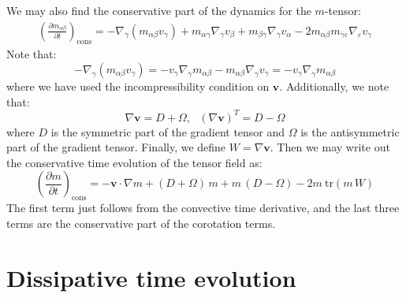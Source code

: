 \documentclass[reqno]{article}
\begin{document}
  We may also find the conservative part of the dynamics for the $m$-tensor:
  \begin{equation}
    \begin{split}
      \left( \frac{\partial m_{\alpha \beta}}{\partial t} \right)_\text{cons}
      =
      - \nabla_\gamma \left( m_{\alpha \beta} v_\gamma \right)
      + m_{\alpha \gamma} \nabla_\gamma v_\beta
      + m_{\beta \gamma} \nabla_\gamma v_\alpha
      - 2 m_{\alpha \beta} m_{\gamma \varepsilon} \nabla_\varepsilon v_\gamma
    \end{split}
  \end{equation}
  Note that:
  \begin{equation}
    - \nabla_\gamma \left( m_{\alpha \beta} v_\gamma \right)
    = - v_\gamma \nabla_\gamma m_{\alpha \beta} - m_{\alpha \beta} \nabla_\gamma v_\gamma
    = - v_\gamma \nabla_\gamma m_{\alpha \beta}
  \end{equation}
  where we have used the incompressibility condition on $\mathbf{v}$.
  Additionally, we note that:
  \begin{equation}
    \nabla \mathbf{v} = D + \Omega, \:\:\: \left( \nabla \mathbf{v} \right)^T = D - \Omega
  \end{equation}
  where $D$ is the symmetric part of the gradient tensor and $\Omega$ is the
  antisymmetric part of the gradient tensor.
  Finally, we define $W = \nabla \mathbf{v}$.
  Then we may write out the conservative time evolution of the tensor field as:
  \begin{equation}
    \left( \frac{\partial m}{\partial t} \right)_\text{cons}
    =
    - \mathbf{v} \cdot \nabla m
    + (D + \Omega) \, m
    + m \, (D - \Omega)
    - 2 m \: \text{tr}(m \, W)
  \end{equation}
  The first term just follows from the convective time derivative, and the last
  three terms are the conservative part of the corotation terms.

  \section{Dissipative time evolution}
  
\end{document}

